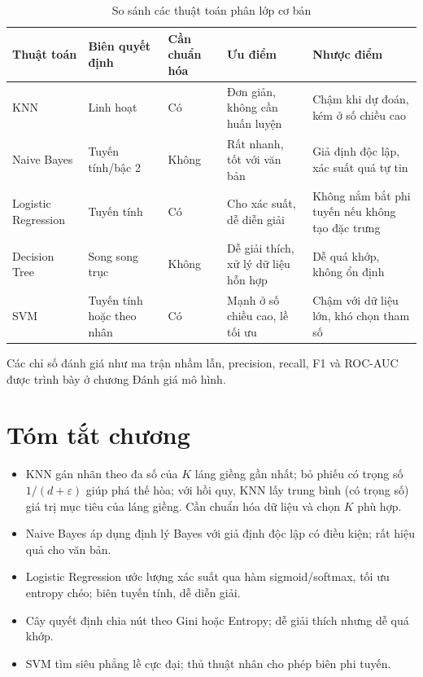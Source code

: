 \begin{table}[H]
\centering
\small
\begin{tabular}{|p{2.4cm}|p{2cm}|p{2cm}|p{3.4cm}|p{3.4cm}|}
\hline
\textbf{Thuật toán} & \textbf{Biên quyết định} & \textbf{Cần chuẩn hóa} & \textbf{Ưu điểm} & \textbf{Nhược điểm} \\
\hline
KNN & Linh hoạt & Có & Đơn giản, không cần huấn luyện & Chậm khi dự đoán, kém ở số chiều cao \\ \hline
Naive Bayes & Tuyến tính/bậc 2 & Không & Rất nhanh, tốt với văn bản & Giả định độc lập, xác suất quá tự tin \\ \hline
Logistic Regression & Tuyến tính & Có & Cho xác suất, dễ diễn giải & Không nắm bắt phi tuyến nếu không tạo đặc trưng \\ \hline
Decision Tree & Song song trục & Không & Dễ giải thích, xử lý dữ liệu hỗn hợp & Dễ quá khớp, không ổn định \\ \hline
SVM & Tuyến tính hoặc theo nhân & Có & Mạnh ở số chiều cao, lề tối ưu & Chậm với dữ liệu lớn, khó chọn tham số \\ \hline
\end{tabular}
\caption{So sánh các thuật toán phân lớp cơ bản}
\end{table}

Các chỉ số đánh giá như ma trận nhầm lẫn, precision, recall, F1 và ROC-AUC được trình bày ở chương Đánh giá mô hình.

\section{Tóm tắt chương}
\begin{itemize}
    \item KNN gán nhãn theo đa số của $K$ láng giềng gần nhất; bỏ phiếu có trọng số $1/(d + \varepsilon)$ giúp phá thế hòa; với hồi quy, KNN lấy trung bình (có trọng số) giá trị mục tiêu của láng giềng. Cần chuẩn hóa dữ liệu và chọn $K$ phù hợp.
    \item Naive Bayes áp dụng định lý Bayes với giả định độc lập có điều kiện; rất hiệu quả cho văn bản.
    \item Logistic Regression ước lượng xác suất qua hàm sigmoid/softmax, tối ưu entropy chéo; biên tuyến tính, dễ diễn giải.
    \item Cây quyết định chia nút theo Gini hoặc Entropy; dễ giải thích nhưng dễ quá khớp.
    \item SVM tìm siêu phẳng lề cực đại; thủ thuật nhân cho phép biên phi tuyến.
\end{itemize}

